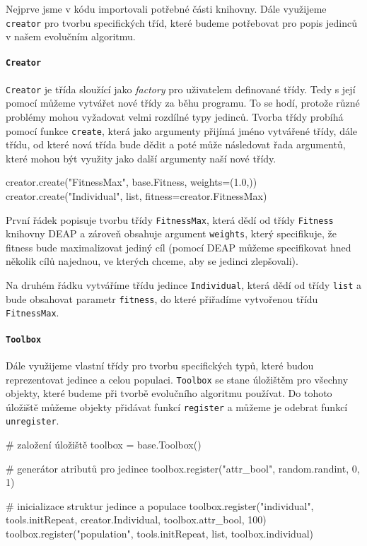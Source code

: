 Nejprve jsme v kódu importovali potřebné části knihovny. Dále využijeme
\texttt{creator} pro tvorbu specifických tříd, které budeme potřebovat pro
popis jedinců v našem evolučním algoritmu.

\paragraph{\texttt{Creator}} 
\texttt{Creator} je třída sloužící jako \emph{factory} pro uživatelem
definované třídy. Tedy s její pomocí můžeme vytvářet nové třídy za běhu
programu. To se hodí, protože různé problémy mohou vyžadovat velmi rozdílné
typy jedinců. Tvorba třídy probíhá pomocí funkce \texttt{create}, která jako
argumenty přijímá jméno vytvářené třídy, dále třídu, od které nová třída bude
dědit a poté může následovat řada argumentů, které mohou být využity jako další
argumenty naší nové třídy.

\begin{code}
creator.create("FitnessMax", base.Fitness, weights=(1.0,))
creator.create("Individual", list, fitness=creator.FitnessMax)
\end{code}

První řádek popisuje tvorbu třídy \texttt{FitnessMax}, která dědí od třídy
\texttt{Fitness} knihovny DEAP a zároveň obsahuje argument \texttt{weights},
který specifikuje, že fitness bude maximalizovat jediný cíl (pomocí DEAP můžeme
specifikovat hned několik cílů najednou, ve kterých chceme, aby se jedinci
zlepšovali).

Na druhém řádku vytváříme třídu jedince \texttt{Individual}, která dědí od třídy
\texttt{list} a bude obsahovat parametr \texttt{fitness}, do které přiřadíme
vytvořenou třídu \texttt{FitnessMax}.

\paragraph{\texttt{Toolbox}}
Dále využijeme vlastní třídy pro tvorbu specifických typů, které budou
reprezentovat jedince a celou populaci. \texttt{Toolbox} se stane úložištěm pro
všechny objekty, které budeme při tvorbě evolučního algoritmu používat. Do
tohoto úložiště můžeme objekty přidávat funkcí \texttt{register} a můžeme je
odebrat funkcí \texttt{unregister}.

\pagebreak
\begin{code}
# založení úložiště 
toolbox = base.Toolbox()

# generátor atributů pro jedince
toolbox.register("attr_bool", random.randint, 0, 1)

# inicializace struktur jedince a populace
toolbox.register("individual", 
                 tools.initRepeat, 
                 creator.Individual, 
                 toolbox.attr_bool, 
                 100)
toolbox.register("population", 
                 tools.initRepeat, 
                 list, 
                 toolbox.individual)
\end{code}

